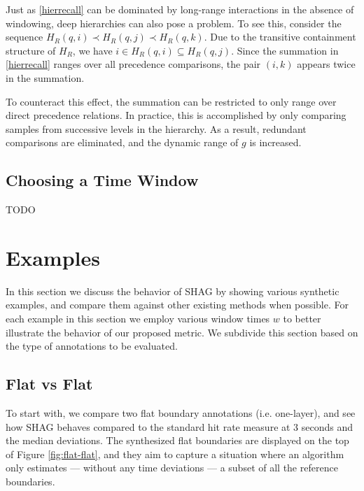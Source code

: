 \documentclass{article}
\begin{document}
Just as \cref{hierrecall} can be dominated by long-range interactions in the absence
of windowing, deep hierarchies can also pose a problem.  To see this, consider the 
sequence $H_R(q, i) \prec H_R(q, j) \prec H_R(q, k)$.  Due to the transitive
containment structure of $H_R$, we have $i \in H_R(q, i) \subseteq H_R(q, j)$.
Since the summation in \cref{hierrecall} ranges over all precedence comparisons, the
pair $(i, k)$ appears twice in the summation.  

To counteract this effect, the summation can be restricted to only range over direct
precedence relations.  In practice, this is accomplished by only comparing samples from
successive levels in the hierarchy.  As a result, redundant comparisons are
eliminated, and the dynamic range of $g$ is increased.

\subsection{Choosing a Time Window}

TODO

\section{Examples}\label{sec:examples}

In this section we discuss the behavior of SHAG by showing various synthetic examples, and compare them against other existing methods when possible.
For each example in this section we employ various window times $w$ to better illustrate the behavior of our proposed metric.
We subdivide this section based on the type of annotations to be evaluated.

\subsection{Flat vs Flat}

To start with, we compare two flat boundary annotations (i.e. one-layer), and see how SHAG behaves compared to the standard hit rate measure at 3 seconds and the median deviations.
The synthesized flat boundaries are displayed on the top of Figure \ref{fig:flat-flat}, and they aim to capture a situation where an algorithm only estimates --- without any time deviations --- a subset of all the reference boundaries.
\end{document}
